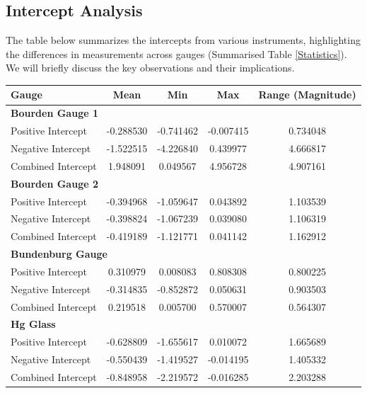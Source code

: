 \documentclass{article}
\begin{document}
\subsection{Intercept Analysis}
The table below summarizes the intercepts from various instruments, highlighting the differences in measurements across gauges (Summarised Table \ref{Statistics}). We will briefly discuss the key observations and their implications.
\begin{table}[H]
	\centering
	\begin{tabular}{lcccc}
		\toprule
		\textbf{Gauge} & \textbf{Mean} & \textbf{Min} & \textbf{Max} & \textbf{Range (Magnitude)} \\
		\midrule
		\multicolumn{5}{l}{\textbf{Bourden Gauge 1}} \\
		Positive Intercept  & -0.288530 & -0.741462 & -0.007415 & 0.734048 \\
		Negative Intercept & -1.522515 & -4.226840 & 0.439977 & 4.666817 \\
		Combined Intercept & 1.948091 & 0.049567 & 4.956728 & 4.907161 \\
		\midrule
		\multicolumn{5}{l}{\textbf{Bourden Gauge 2}} \\
		Positive Intercept & -0.394968 & -1.059647 & 0.043892 & 1.103539 \\
		Negative Intercept & -0.398824 & -1.067239 & 0.039080 & 1.106319 \\
		Combined Intercept & -0.419189 & -1.121771 & 0.041142 & 1.162912 \\
		\midrule
		\multicolumn{5}{l}{\textbf{Bundenburg Gauge}} \\
		Positive Intercept & 0.310979 & 0.008083 & 0.808308 & 0.800225 \\
		Negative Intercept & -0.314835 & -0.852872 & 0.050631 & 0.903503 \\
		Combined Intercept & 0.219518 & 0.005700 & 0.570007 & 0.564307 \\
		\midrule
		\multicolumn{5}{l}{\textbf{Hg Glass}} \\
		Positive Intercept & -0.628809 & -1.655617 & 0.010072 & 1.665689 \\
		Negative Intercept & -0.550439 & -1.419527 & -0.014195 & 1.405332 \\
		Combined Intercept & -0.848958 & -2.219572 & -0.016285 & 2.203288 \\
		\bottomrule
	\end{tabular}
	\label{tab:intercept_analysis}
\end{table}
\end{document}
